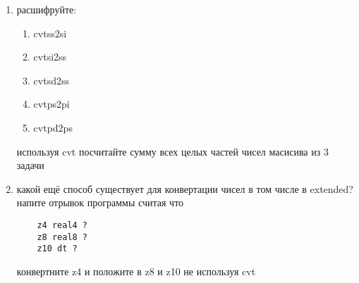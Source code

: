 \documentclass[a4paper,10pt]{article}
\begin{document}
\begin{enumerate}
    \item расшифруйте:
    \begin{enumerate}
        \item cvtss2si 
        \item cvtsi2ss
        \item cvtsd2ss
        \item cvtps2pi
        \item cvtpd2ps 
    \end{enumerate}
    используя cvt посчитайте сумму всех целых частей чисел масисива из 3 задачи\\
    \item  какой ещё способ существует для конвертации чисел в том числе в extended? \\
    напите отрывок программы считая что \\
\begin{verbatim}
    z4 real4 ?
    z8 real8 ?
    z10 dt ?
\end{verbatim}
    конвертните z4 и положите в z8 и z10 не используя cvt
\end{enumerate}
\end{document}
